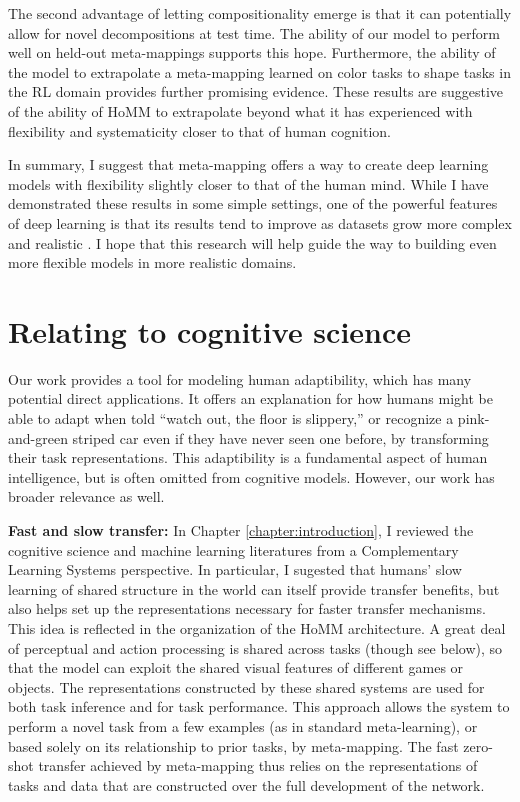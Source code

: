 The second advantage of letting compositionality emerge is that it can potentially allow for novel decompositions at test time. The ability of our model to perform well on held-out meta-mappings supports this hope. Furthermore, the ability of the model to extrapolate a meta-mapping learned on color tasks to shape tasks in the RL domain provides further promising evidence. These results are suggestive of the ability of HoMM to extrapolate beyond what it has experienced with flexibility and systematicity closer to that of human cognition.\par

In summary, I suggest that meta-mapping offers a way to create deep learning models with flexibility slightly closer to that of the human mind. While I have demonstrated these results in some simple settings, one of the powerful features of deep learning is that its results tend to improve as datasets grow more complex and realistic \citep{Hill2019a,Radford2019,Sutton2019}. I hope that this research will help guide the way to building even more flexible models in more realistic domains. \par

\section{Relating to cognitive science}

Our work provides a tool for modeling human adaptibility, which has many potential direct applications. It offers an explanation for how humans might be able to adapt when told ``watch out, the floor is slippery,'' or recognize a pink-and-green striped car even if they have never seen one before, by transforming their task representations. This adaptibility is a fundamental aspect of human intelligence, but is often omitted from cognitive models. However, our work has broader relevance as well. \par 

\textbf{Fast and slow transfer:} In Chapter \ref{chapter:introduction}, I reviewed the cognitive science and machine learning literatures from a Complementary Learning Systems perspective. In particular, I sugested that humans' slow learning of shared structure in the world can itself provide transfer benefits, but also helps set up the representations necessary for faster transfer mechanisms. This idea is reflected in the organization of the HoMM architecture. A great deal of perceptual and action processing is shared across tasks (though see below), so that the model can exploit the shared visual features of different games or objects. The representations constructed by these shared systems are used for both task inference and for task performance. This approach allows the system to perform a novel task from a few examples (as in standard meta-learning), or based solely on its relationship to prior tasks, by meta-mapping. The fast zero-shot transfer achieved by meta-mapping thus relies on the representations of tasks and data that are constructed over the full development of the network. \par

